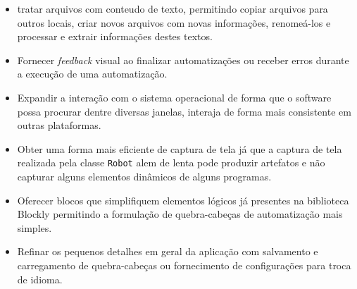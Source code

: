 \documentclass[tg]{mdtufsm}
\begin{document}
    \begin{itemize}
    	\item tratar arquivos com conteudo de texto, permitindo copiar arquivos para outros locais, criar novos arquivos com novas informações, renomeá-los e processar e extrair informações destes textos.
    	\item Fornecer \emph{feedback} visual ao finalizar automatizações ou receber erros durante a execução de uma automatização.
        \item Expandir a interação com o sistema operacional de forma que o software possa procurar dentre diversas janelas, interaja de forma mais consistente em outras plataformas.
    	\item Obter uma forma mais eficiente de captura de tela já que a captura de tela realizada pela classe \texttt{Robot} alem de lenta pode produzir artefatos e não capturar alguns elementos dinâmicos de alguns programas.
        \item Oferecer blocos que simplifiquem elementos lógicos já presentes na biblioteca Blockly permitindo a formulação de quebra-cabeças de automatização mais simples.
        \item Refinar os pequenos detalhes em geral da aplicação com salvamento e carregamento de quebra-cabeças ou fornecimento de configurações para troca de idioma.
    \end{itemize}

	\setlength{\baselineskip}{\baselineskip}
	
	
\end{document}
